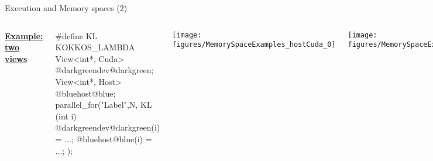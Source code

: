 \ifmedium
\begin{frame}[fragile]{Execution and Memory spaces (2)}

  \begin{columns}[t,onlytextwidth]

    \vspace{15pt}

    \ul{\textbf{Example: two views}}

    \vspace{5pt}

    \begin{code}[linebackgroundcolor={
          \btLstHL<2>{7}{red!20}
        },
        keywords={}]
#define KL KOKKOS_LAMBDA
View<int*, Cuda> @darkgreendev@darkgreen;
View<int*, Host> @bluehost@blue;
parallel_for("Label",N,
  KL (int i) {
    @darkgreendev@darkgreen(i)  = ...;
    @bluehost@blue(i) = ...;
  });
    \end{code}


      \begin{center}
        \texttt{[image: figures/MemorySpaceExamples\_hostCuda\_0]}
      \end{center}
      \begin{center}
        \texttt{[image: figures/MemorySpaceExamples\_hostCuda\_1]}
      \end{center}

  \end{columns}

\end{frame}
\fi


